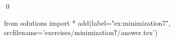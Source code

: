 
\begin{ex} 
  \label{ex:minimization7}
  
  \qed
\end{ex} 
\begin{python0}
from solutions import *
add(label="ex:minimization7",
    srcfilename='exercises/minimization7/answer.tex') 
\end{python0}
